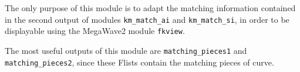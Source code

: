The only purpose of this module is to adapt the matching information
contained in the second output of modules \verb+km_match_ai+
and \verb+km_match_si+, in order to be displayable using the MegaWave2
module \verb+fkview+.  

The most useful outputs of this module are \verb+matching_pieces1+ and
\verb+matching_pieces2+, since these Flists contain the matching pieces
of curve.

